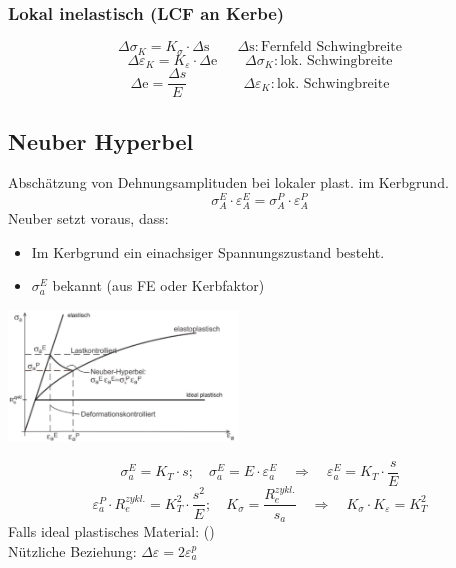         \subsubsection{Lokal inelastisch (LCF an Kerbe)}
            \[\Delta\sigma_K = K_{\sigma} \cdot \Delta\textrm{s} \qquad \Delta\textrm{s}:\textrm{Fernfeld Schwingbreite}\]
            \[\Delta\varepsilon_K = K_{\varepsilon} \cdot \Delta\textrm{e} \qquad \Delta\sigma_K:\textrm{lok. Schwingbreite}\]
            \[\Delta\textrm{e}=\frac{\Delta s}{E} \qquad\qquad \Delta\varepsilon_K:\textrm{lok. Schwingbreite}\]
    \subsection{Neuber Hyperbel}
        Abschätzung von Dehnungsamplituden bei lokaler plast. im Kerbgrund.
        \[\boxed{\sigma_A^E\cdot\varepsilon_A^E = \sigma_A^P \cdot \varepsilon_A^P}\]
        Neuber setzt voraus, dass:
        \begin{itemize}
            \item Im Kerbgrund ein einachsiger Spannungszustand besteht.
            \item $\sigma_a^E$ bekannt (aus FE oder Kerbfaktor)
        \end{itemize}
        \begin{center}
            \includegraphics[width=0.8\linewidth, height=35mm]{images/06/Neuber_Hyperbel.jpeg}
        \end{center}
        \[\sigma_a^E = K_T \cdot s; \quad \sigma_a^E = E \cdot \varepsilon_a^E \quad\Rightarrow\quad \varepsilon_a^E = K_T \cdot \frac{s}{E}\]
        \vspace{-4mm}\[\varepsilon_a^P \cdot R_{e}^{zykl.} = K_T^2 \cdot \frac{s^2}{E}; \quad K_{\sigma}=\frac{R_{e}^{zykl.}}{s_a} \quad\Rightarrow\quad K_{\sigma} \cdot K_{\varepsilon} = K_T^2\]
        Falls ideal plastisches Material: ()
        \\Nützliche Beziehung: $\Delta\varepsilon = 2\varepsilon_{a}^{p}$
    
\vfill\null\columnbreak
